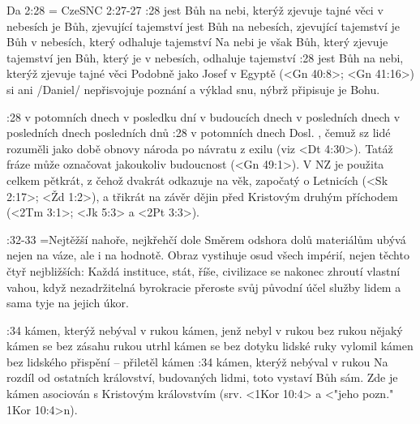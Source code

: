 \renum Da 2:28 = CzeSNC 2:27-27
:28
    {jest Bůh na nebi, kterýž zjevuje tajné věci}  %
    {v nebesích je Bůh, zjevující tajemství}  %
    {jest Bůh na nebesích, zjevující tajemství}  %
    {je Bůh v nebesích, který odhaluje tajemství}  %
    {Na nebi je však Bůh, který zjevuje tajemství}  %
    {jen Bůh, který je v nebesích, odhaluje tajemství}  %
:28 {jest Bůh na nebi, kterýž zjevuje tajné věci} Podobně jako Josef v Egyptě (<Gn 40:8>; <Gn 41:16>) si ani \x/Daniel/ nepřisvojuje poznání a výklad snu, nýbrž připisuje je Bohu.

:28  
    {v potomních dnech}  %
    {v posledku dní} %
    {v budoucích dnech}  %
    {v posledních dnech} %
    {v posledních dnech}  %
    {posledních dnů}  %
:28 {v potomních dnech} Dosl. , čemuž sz lidé rozuměli jako době obnovy národa po návratu z exilu (viz <Dt 4:30>). Tatáž fráze může označovat 
    jakoukoliv budoucnost  (<Gn 49:1>).  V NZ je použita celkem pětkrát, z čehož dvakrát odkazuje na věk, započatý o Letnicích (<Sk 2:17>; <Žd 1:2>), a třikrát na závěr dějin před Kristovým druhým příchodem (<2Tm 3:1>; <Jk 5:3> a <2Pt 3:3>). 

:32-33 {}={Nejtěžší nahoře, nejkřehčí dole} Směrem odshora dolů materiálům ubývá nejen na váze, ale i na hodnotě. Obraz vystihuje osud všech impérií,  nejen těchto čtyř nejbližších: 
    Každá instituce, stát, říše, civilizace se nakonec zhroutí vlastní vahou, když  nezadržitelná byrokracie přeroste svůj původní účel služby lidem a sama tyje na jejich úkor.

:34
    {kámen, kterýž nebýval v rukou}  %
    {kámen, jenž nebyl v rukou} %
    {bez rukou nějaký kámen}  %
    {se bez zásahu rukou utrhl kámen} %
    {se bez dotyku lidské ruky vylomil kámen}  %
    {bez lidského přispění -- přiletěl kámen}  %
:34 {kámen, kterýž nebýval v rukou} Na rozdíl od ostatních království, budovaných lidmi, toto vystaví Bůh sám. Zde  je kámen asociován s Kristovým královstvím    (srv. <1Kor 10:4> a <"jeho pozn." 1Kor 10:4>n).

